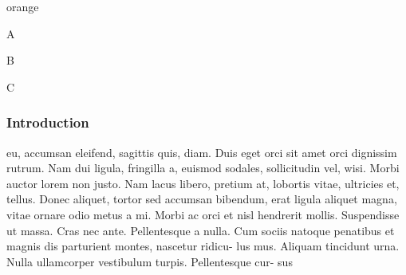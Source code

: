 \begin{items}{orange}{\Triangle}
    \item A
    \item B
    \item C
\end{items}

\subsubsection{Introduction}

eu, accumsan eleifend, sagittis quis, diam. Duis eget orci sit amet orci dignissim rutrum.
Nam dui ligula, fringilla a, euismod sodales, sollicitudin vel, wisi. Morbi auctor lorem
non justo. Nam lacus libero, pretium at, lobortis vitae, ultricies et, tellus. Donec aliquet,
tortor sed accumsan bibendum, erat ligula aliquet magna, vitae ornare odio metus a mi.
Morbi ac orci et nisl hendrerit mollis. Suspendisse ut massa. Cras nec ante. Pellentesque
a nulla. Cum sociis natoque penatibus et magnis dis parturient montes, nascetur ridicu-
lus mus. Aliquam tincidunt urna. Nulla ullamcorper vestibulum turpis. Pellentesque cur-
sus



